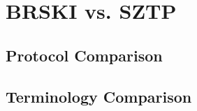 \chapter{BRSKI vs. SZTP}\label{appendix-A}
\section{Protocol Comparison}

\section{Terminology Comparison}
